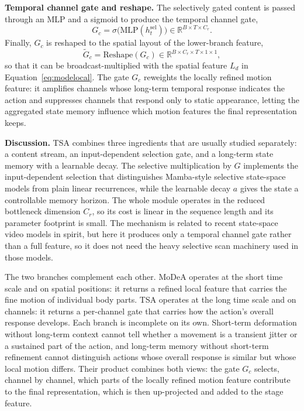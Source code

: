\noindent\textbf{Temporal channel gate and reshape.}
The selectively gated content is passed through an MLP and a sigmoid to
produce the temporal channel gate,
\begin{equation}
  G_c = \sigma\big(\mathrm{MLP}(h_t^{\mathrm{sel}})\big)
  \in \mathbb{R}^{B \times T \times C_r}.
\end{equation}
Finally, $G_c$ is reshaped to the spatial layout of the lower-branch feature,
\begin{equation}
  \tilde{G}_c = \mathrm{Reshape}(G_c) \in \mathbb{R}^{B \times C_r \times T \times 1 \times 1},
\end{equation}
so that it can be broadcast-multiplied with the spatial feature $L_d$ in
Equation~\eqref{eq:modelocal}. The gate $G_c$ reweights the locally refined
motion feature: it amplifies channels whose long-term temporal response
indicates the action and suppresses channels that respond only to static
appearance, letting the aggregated state memory influence which motion
features the final representation keeps.

\noindent\textbf{Discussion.}
TSA combines three ingredients that are usually studied separately: a content
stream, an input-dependent selection gate, and a long-term state memory with a
learnable decay. The selective multiplication by $G$ implements the
input-dependent selection that distinguishes Mamba-style selective state-space
models from plain linear recurrences, while the learnable decay $a$ gives the
state a controllable memory horizon. The whole module operates in the
reduced bottleneck dimension $C_r$, so its cost is linear in the sequence
length and its parameter footprint is small. The mechanism is related to
recent state-space video models \cite{videomamba2024} in spirit, but here it
produces only a temporal channel gate rather than a full feature, so it does
not need the heavy selective scan machinery used in those models.

The two branches complement each other. MoDeA operates at the short time scale
and on spatial positions: it returns a refined local feature that carries the
fine motion of individual body parts. TSA operates at the long time scale and
on channels: it returns a per-channel gate that carries how the action's
overall response develops. Each branch is incomplete on its own. Short-term
deformation without long-term context cannot tell whether a movement is a
transient jitter or a sustained part of the action, and long-term memory
without short-term refinement cannot distinguish actions whose overall response
is similar but whose local motion differs. Their product combines both views:
the gate $G_c$ selects, channel by channel, which parts of the locally refined
motion feature contribute to the final representation, which is then
up-projected and added to the stage feature.

